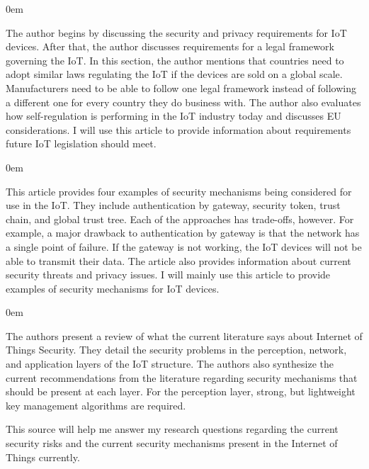 \documentclass{article}
\newenvironment{annotation}{\begin{addmargin}[2.5em]{0em} \begin{flushleft}}{\end{flushleft} \end{addmargin}}
\begin{document}
\begin{annotation}
The author begins by discussing the security and privacy requirements for IoT devices. After that, the author discusses requirements for a legal framework governing the IoT. In this section, the author
mentions that countries need to adopt similar laws regulating the IoT if the devices are sold on a global scale. Manufacturers need to be able to follow one legal framework instead of following a different
one for every country they do business with. The author also evaluates how self-regulation is performing in the IoT industry today and discusses EU considerations. I will use this article to provide 
information about requirements future IoT legislation should meet. 
\end{annotation}

\newpage
{}
\begin{annotation}
This article provides four examples of security mechanisms being considered for use in the IoT. They include authentication by gateway, security token, trust chain, and global trust tree. Each of the 
approaches has trade-offs, however.
For example, a major drawback to authentication by gateway is that the network has a single point of failure. If the gateway is not working, the IoT devices will not be able to transmit their data.
 The article also provides information about current security threats and privacy issues. I will mainly use this article to provide examples of security mechanisms for
IoT devices. 
\end{annotation}

\begin{annotation}
The authors present a review of what the current literature says about Internet of Things Security. 
They detail the security problems in the perception, network, and application layers of the IoT structure. 
The authors also synthesize the current recommendations from the literature regarding security mechanisms that should be present at each layer. For the perception layer, strong, but lightweight key management algorithms are required.

This source will help me answer my research questions regarding the current security risks and the current security mechanisms present in the Internet of Things currently.
\end{annotation}
\end{document}
